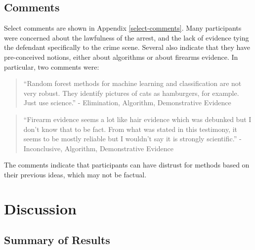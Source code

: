 \documentclass[print]{nuthesis}
\begin{document}
\hypertarget{comments}{%
\subsection{Comments}\label{comments}}

Select comments are shown in Appendix \ref{select-comments}.
Many participants were concerned about the lawfulness of the arrest, and the lack of evidence tying the defendant specifically to the crime scene.
Several also indicate that they have pre-conceived notions, either about algorithms or about firearms evidence.
In particular, two comments were:

\begin{quote}
``Random forest methods for machine learning and classification are not very robust. They identify pictures of cats as hamburgers, for example. Just use science.'' - Elimination, Algorithm, Demonstrative Evidence
\end{quote}

\begin{quote}
``Firearm evidence seems a lot like hair evidence which was debunked but I don't know that to be fact. From what was stated in this testimony, it seems to be mostly reliable but I wouldn't say it is strongly scientific.'' - Inconclusive, Algorithm, Demonstrative Evidence
\end{quote}

The comments indicate that participants can have distrust for methods based on their previous ideas, which may not be factual.

\hypertarget{discussion}{%
\section{Discussion}\label{discussion}}

\hypertarget{summary-of-results}{%
\subsection{Summary of Results}\label{summary-of-results}}
\end{document}
